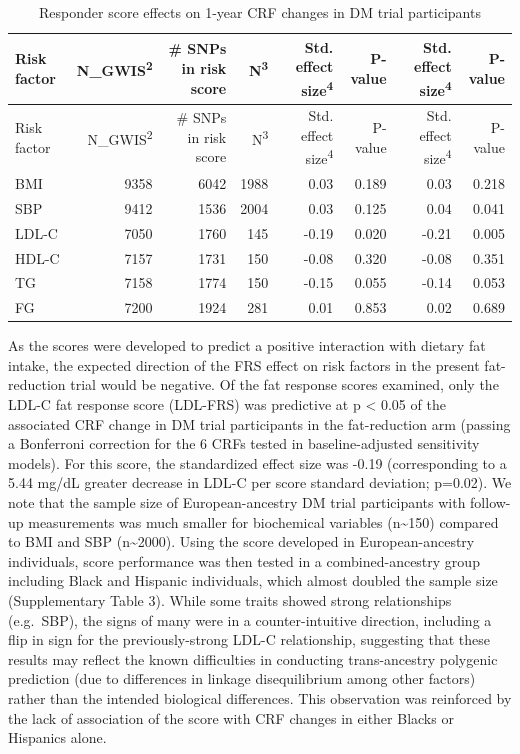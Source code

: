 \documentclass[]{article}
\begin{document}
\begin{longtable}[]{@{}lrrrrrrr@{}}
\caption{Responder score effects on 1-year CRF changes in DM trial
participants}\tabularnewline
\toprule
Risk factor & N\_GWIS\textsuperscript{2} & \# SNPs in risk score &
N\textsuperscript{3} & Std. effect size\textsuperscript{4} & P-value &
Std. effect size\textsuperscript{4} & P-value\tabularnewline
\midrule
\endfirsthead
\toprule
Risk factor & N\_GWIS\textsuperscript{2} & \# SNPs in risk score &
N\textsuperscript{3} & Std. effect size\textsuperscript{4} & P-value &
Std. effect size\textsuperscript{4} & P-value\tabularnewline
\midrule
\endhead
BMI & 9358 & 6042 & 1988 & 0.03 & 0.189 & 0.03 & 0.218\tabularnewline
SBP & 9412 & 1536 & 2004 & 0.03 & 0.125 & 0.04 & 0.041\tabularnewline
LDL-C & 7050 & 1760 & 145 & -0.19 & 0.020 & -0.21 & 0.005\tabularnewline
HDL-C & 7157 & 1731 & 150 & -0.08 & 0.320 & -0.08 & 0.351\tabularnewline
TG & 7158 & 1774 & 150 & -0.15 & 0.055 & -0.14 & 0.053\tabularnewline
FG & 7200 & 1924 & 281 & 0.01 & 0.853 & 0.02 & 0.689\tabularnewline
\bottomrule
\end{longtable}

As the scores were developed to predict a positive interaction with
dietary fat intake, the expected direction of the FRS effect on risk
factors in the present fat-reduction trial would be negative. Of the fat
response scores examined, only the LDL-C fat response score (LDL-FRS)
was predictive at p \textless{} 0.05 of the associated CRF change in DM
trial participants in the fat-reduction arm (passing a Bonferroni
correction for the 6 CRFs tested in baseline-adjusted sensitivity
models). For this score, the standardized effect size was -0.19
(corresponding to a 5.44 mg/dL greater decrease in LDL-C per score
standard deviation; p=0.02). We note that the sample size of
European-ancestry DM trial participants with follow-up measurements was
much smaller for biochemical variables (n\textasciitilde{}150) compared
to BMI and SBP (n\textasciitilde{}2000). Using the score developed in
European-ancestry individuals, score performance was then tested in a
combined-ancestry group including Black and Hispanic individuals, which
almost doubled the sample size (Supplementary Table 3). While some
traits showed strong relationships (e.g.~SBP), the signs of many were in
a counter-intuitive direction, including a flip in sign for the
previously-strong LDL-C relationship, suggesting that these results may
reflect the known difficulties in conducting trans-ancestry polygenic
prediction (due to differences in linkage disequilibrium among other
factors) rather than the intended biological differences. This
observation was reinforced by the lack of association of the score with
CRF changes in either Blacks or Hispanics alone.
\end{document}
